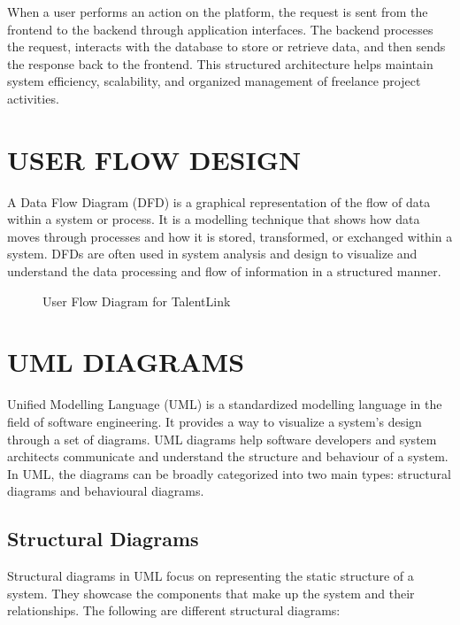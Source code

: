 \documentclass[12pt,a4paper,oneside]{report}
\numberwithin{figure}{chapter}
\numberwithin{table}{chapter}
\begin{document}
\indent When a user performs an action on the platform, the request is sent from the
frontend to the backend through application interfaces. The backend processes the
request, interacts with the database to store or retrieve data, and then sends the
response back to the frontend. This structured architecture helps maintain system
efficiency, scalability, and organized management of freelance project activities.

\section{USER FLOW DESIGN}

A Data Flow Diagram (DFD) is a graphical representation of the flow of data within a
system or process. It is a modelling technique that shows how data moves through
processes and how it is stored, transformed, or exchanged within a system. DFDs are often
used in system analysis and design to visualize and understand the data processing and
flow of information in a structured manner.

\begin{figure}[H]
  \centering
  \caption{User Flow Diagram for TalentLink}
  \label{fig:userflow}
\end{figure}

\section{UML DIAGRAMS}

Unified Modelling Language (UML) is a standardized modelling language in the field of
software engineering. It provides a way to visualize a system's design through a set of
diagrams. UML diagrams help software developers and system architects communicate and
understand the structure and behaviour of a system. In UML, the diagrams can be broadly
categorized into two main types: structural diagrams and behavioural diagrams.

\subsection{Structural Diagrams}

Structural diagrams in UML focus on representing the static structure of a system. They
showcase the components that make up the system and their relationships. The following
are different structural diagrams:
\end{document}
